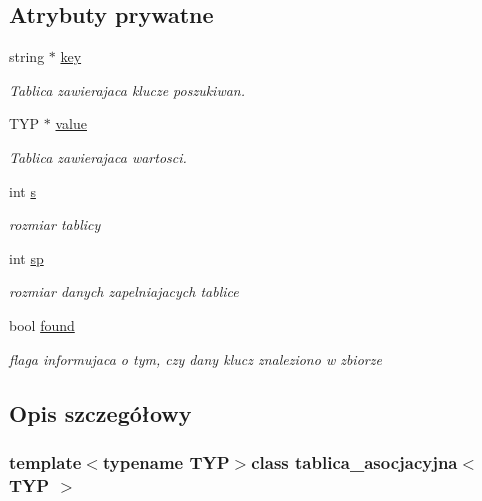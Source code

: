 \subsection*{\-Atrybuty prywatne}
\begin{DoxyCompactItemize}
\item 
string $\ast$ \hyperlink{classtablica__asocjacyjna_aefde9ad3347d42f36cab258144bacc1f}{key}
\begin{DoxyCompactList}\small\item\em \-Tablica zawierajaca klucze poszukiwan. \end{DoxyCompactList}\item 
\-T\-Y\-P $\ast$ \hyperlink{classtablica__asocjacyjna_a28719743b86b0a16db652afda20b665c}{value}
\begin{DoxyCompactList}\small\item\em \-Tablica zawierajaca wartosci. \end{DoxyCompactList}\item 
int \hyperlink{classtablica__asocjacyjna_a4a9d8aa0a03fd1ccf2fa7980d61bc197}{s}
\begin{DoxyCompactList}\small\item\em rozmiar tablicy \end{DoxyCompactList}\item 
int \hyperlink{classtablica__asocjacyjna_a2af0a8be0f335f5ad09f908cb08c0039}{sp}
\begin{DoxyCompactList}\small\item\em rozmiar danych zapelniajacych tablice \end{DoxyCompactList}\item 
bool \hyperlink{classtablica__asocjacyjna_aa3423d398d1a6b96e3f42398a2ce5a1e}{found}
\begin{DoxyCompactList}\small\item\em flaga informujaca o tym, czy dany klucz znaleziono w zbiorze \end{DoxyCompactList}\end{DoxyCompactItemize}


\subsection{\-Opis szczegółowy}
\subsubsection*{template$<$typename \-T\-Y\-P$>$class tablica\-\_\-asocjacyjna$<$ T\-Y\-P $>$}

